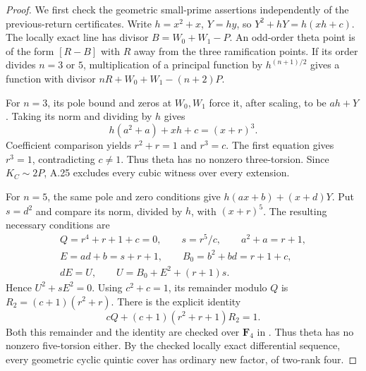 \documentclass[11pt]{article}
\begin{document}
\begin{proof}
We first check the geometric small-prime assertions independently of
the previous-return certificates.  Write $h=x^2+x$, $Y=hy$, so
$Y^2+hY=h(xh+c)$.  The locally exact line has divisor
$B=W_0+W_1-P$.  An odd-order theta point is of the form $[R-B]$ with
$R$ away from the three ramification points.  If its order divides
$n=3$ or $5$, multiplication of a principal function by
$h^{(n+1)/2}$ gives a function with divisor
$nR+W_0+W_1-(n+2)P$.

For $n=3$, its pole bound and zeros at $W_0,W_1$ force it, after
scaling, to be $ah+Y$.  Taking its norm and dividing by $h$ gives
\[
             h(a^2+a)+xh+c=(x+r)^3.
\]
Coefficient comparison yields $r^2+r=1$ and $r^3=c$.
The first equation gives $r^3=1$, contradicting $c\ne1$.
Thus theta has no nonzero three-torsion.  Since $K_C\sim2P$,
A.25 excludes every cubic witness over every extension.

For $n=5$, the same pole and zero conditions give
$h(ax+b)+(x+d)Y$.  Put $s=d^2$ and compare its norm, divided by $h$,
with $(x+r)^5$.  The resulting necessary conditions are
\[
 \begin{gathered}
 Q=r^4+r+1+c=0,\qquad s=r^5/c,\qquad a^2+a=r+1,\\
 E=ad+b=s+r+1,\qquad B_0=b^2+bd=r+1+c,\\
 dE=U,\qquad U=B_0+E^2+(r+1)s.
 \end{gathered}
\]
Hence $U^2+sE^2=0$.
Using $c^2+c=1$, its remainder modulo $Q$ is
$R_2=(c+1)(r^2+r)$.  There is the explicit identity
\[
                    cQ+(c+1)(r^2+r+1)R_2=1.
\]
Both this remainder and the identity are checked over $\mathbf F_4$
in .  Thus theta has no nonzero
five-torsion either.  By the checked locally exact differential
sequence, every geometric cyclic quintic cover has ordinary new
factor, of two-rank four.


\end{proof}
\end{document}
